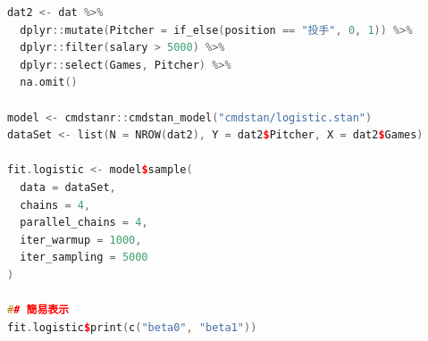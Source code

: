 \begin{lstlisting}[language=c++,label={code:24_02},caption={ロジスティック回帰分析を実行するRコード}]
dat2 <- dat %>%
  dplyr::mutate(Pitcher = if_else(position == "投手", 0, 1)) %>%
  dplyr::filter(salary > 5000) %>%
  dplyr::select(Games, Pitcher) %>%
  na.omit()

model <- cmdstanr::cmdstan_model("cmdstan/logistic.stan")
dataSet <- list(N = NROW(dat2), Y = dat2$Pitcher, X = dat2$Games)

fit.logistic <- model$sample(
  data = dataSet,
  chains = 4,
  parallel_chains = 4,
  iter_warmup = 1000,
  iter_sampling = 5000
)

## 簡易表示
fit.logistic$print(c("beta0", "beta1"))
\end{lstlisting}
